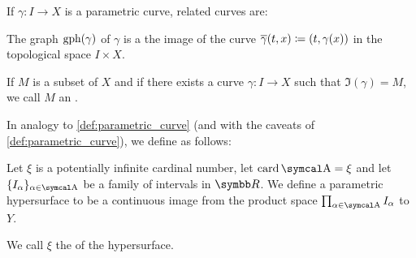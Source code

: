 \begin{definition}
  If \( \gamma: I \to X \) is a parametric curve, related curves are:
  \begin{defenum}
    \cite[definition 1.20]{Иванов2017} The graph \( \operatorname{gph}(\gamma) \) of \( \gamma \) is a the image of the curve \( \overline{\gamma}(t, x) \coloneqq (t, \gamma(x)) \) in the topological space \( I \times X \).

    \cite[definition 1.24]{Иванов2017} If \( M \) is a subset of \( X \) and if there exists a curve \( \gamma: I \to X \) such that \( \Im(\gamma) = M \), we call \( M \) an .
  \end{defenum}
\end{definition}

\begin{definition}\label{def:parametric_hypersurface}
  In analogy to \cref{def:parametric_curve} (and with the caveats of \cref{def:parametric_curve}), we define  as follows:

  Let \( \xi \) is a potentially infinite cardinal number, let \( \Card \CA = \xi \) and let \( \{ I_\alpha \}_{\alpha \in \CA} \) be a family of intervals in \( \BR \). We define a parametric hypersurface to be a continuous image from the product space \( \prod_{\alpha \in \CA} I_\alpha \) to \( Y \).

  We call \( \xi \) the  of the hypersurface.
\end{definition}
